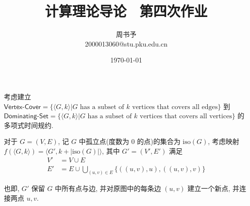 \documentclass[8pt]{article}
\title{\heiti\zihao{1} 计算理论导论 \ 第四次作业}
\author{\kaishu\zihao{-3} 周书予\\2000013060@stu.pku.edu.cn}
\date{\today}
\theoremstyle{compact}
\begin{document}
\pagestyle{plain}



\maketitle

\section{}

考虑建立 $\textsf{Vertex-Cover} = \{\langle G, k \rangle | G \text { has a subset of } k \text{ vertices that covers all 	edges}\}$ 到 $\textsf{Dominating-Set} = \{\langle G, k \rangle | G \text { has a subset of } k \text{ vertices that covers all 	vertices}\}$ 的多项式时间规约.

对于 $G = (V, E)$, 记 $G$ 中孤立点(度数为 $0$ 的点)的集合为 $\text{iso}(G)$, 考虑映射 $f(\langle G, k \rangle) = \langle G', k + |\text{iso}(G)| \rangle$, 其中 $G' = (V', E')$ 满足 \begin{equation*}
	\begin{split}
		V' &= V \cup E \\
		E' &= E \cup \bigcup_{(u, v) \in E}\{((u, v), u), ((u, v), v)\}
	\end{split}
\end{equation*}

也即, $G'$ 保留 $G$ 中所有点与边, 并对原图中的每条边 $(u, v)$ 建立一个新点, 并连接两点 $u, v$.
\end{document}
